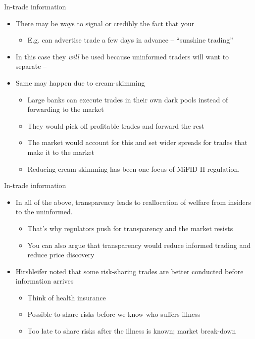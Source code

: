 \documentclass[english,10pt
,aspectratio=169
]{beamer}
\begin{document}
\begin{frame}{In-trade information}
	\begin{itemize}
		\item There may be ways to signal or credibly  the fact that your 
		\begin{itemize}
			\item E.g. can advertise trade a few days in advance -- ``sunshine trading''
		\end{itemize}
		\item In this case they \emph{will} be used because uninformed traders will want to separate -- 
		\item Same may happen due to \alert{cream-skimming}
		\begin{itemize}
			\item Large banks can execute trades in their own dark pools instead of forwarding to the market
			\item They would pick off profitable trades and forward the rest
			\item The market would account for this and set wider spreads for trades that make it to the market
			\item Reducing cream-skimming has been one focus of MiFID II regulation.
		\end{itemize}
	\end{itemize}
\end{frame}


\begin{frame}{In-trade information}
	\begin{itemize}
		\item In all of the above, transparency leads to reallocation of welfare from insiders to the uninformed.
		\begin{itemize}
			\item That's why regulators push for transparency and the market resists
			\item You can also argue that transparency would reduce informed trading and reduce price discovery
		\end{itemize}
		\item Hirshleifer noted that some risk-sharing trades are better conducted before information arrives
		\begin{itemize}
			\item Think of health insurance
			\item Possible to share risks before we know who suffers illness
			\item Too late to share risks after the illness is known; market break-down
		\end{itemize}
	\end{itemize}
\end{frame}
\end{document}
